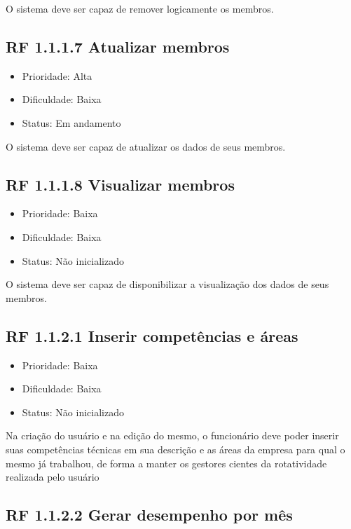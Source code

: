 \begin{apendicesenv}
O sistema deve ser capaz de remover logicamente os membros.


\subsection{RF 1.1.1.7 Atualizar membros}

\begin{itemize}
  \item{Prioridade: Alta}
  \item{Dificuldade: Baixa}
  \item{Status: Em andamento}
\end{itemize}

O sistema deve ser capaz de atualizar os dados de seus membros.



\subsection{RF 1.1.1.8 Visualizar membros}

\begin{itemize}
  \item{Prioridade: Baixa}
  \item{Dificuldade: Baixa}
  \item{Status: Não inicializado}
\end{itemize}

O sistema deve ser capaz de disponibilizar a visualização dos dados de seus membros.


\subsection{RF 1.1.2.1 Inserir competências e áreas}

\begin{itemize}
  \item{Prioridade: Baixa}
  \item{Dificuldade: Baixa}
  \item{Status: Não inicializado}
\end{itemize}

Na criação do usuário e na edição do mesmo, o funcionário deve poder inserir suas competências técnicas em sua descrição e as áreas da empresa para qual o mesmo já trabalhou, de forma a manter os gestores cientes da rotatividade realizada pelo usuário


\subsection{RF 1.1.2.2 Gerar desempenho por mês}


\end{apendicesenv}

